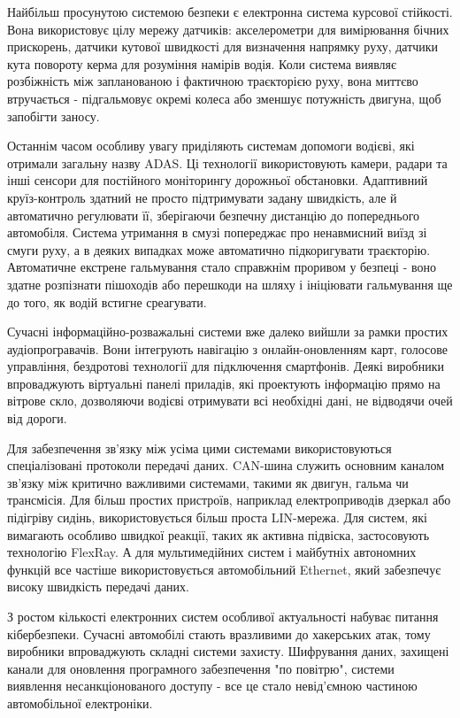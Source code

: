 \documentclass[14pt]{extreport}
\begin{document}
Найбільш просунутою системою безпеки є електронна система курсової стійкості. Вона використовує цілу мережу датчиків: акселерометри для вимірювання бічних прискорень, датчики кутової швидкості для визначення напрямку руху, датчики кута повороту керма для розуміння намірів водія. Коли система виявляє розбіжність між запланованою і фактичною траєкторією руху, вона миттєво втручається - підгальмовує окремі колеса або зменшує потужність двигуна, щоб запобігти заносу.

Останнім часом особливу увагу приділяють системам допомоги водієві, які отримали загальну назву ADAS. Ці технології використовують камери, радари та інші сенсори для постійного моніторингу дорожньої обстановки. Адаптивний круїз-контроль здатний не просто підтримувати задану швидкість, але й автоматично регулювати її, зберігаючи безпечну дистанцію до попереднього автомобіля. Система утримання в смузі попереджає про ненавмисний виїзд зі смуги руху, а в деяких випадках може автоматично підкоригувати траєкторію. Автоматичне екстрене гальмування стало справжнім проривом у безпеці - воно здатне розпізнати пішоходів або перешкоди на шляху і ініціювати гальмування ще до того, як водій встигне среагувати.

Сучасні інформаційно-розважальні системи вже далеко вийшли за рамки простих аудіопрогравачів. Вони інтегрують навігацію з онлайн-оновленням карт, голосове управління, бездротові технології для підключення смартфонів. Деякі виробники впроваджують віртуальні панелі приладів, які проектують інформацію прямо на вітрове скло, дозволяючи водієві отримувати всі необхідні дані, не відводячи очей від дороги.

Для забезпечення зв'язку між усіма цими системами використовуються спеціалізовані протоколи передачі даних. CAN-шина служить основним каналом зв'язку між критично важливими системами, такими як двигун, гальма чи трансмісія. Для більш простих пристроїв, наприклад електроприводів дзеркал або підігріву сидінь, використовується більш проста LIN-мережа. Для систем, які вимагають особливо швидкої реакції, таких як активна підвіска, застосовують технологію FlexRay. А для мультимедійних систем і майбутніх автономних функцій все частіше використовується автомобільний Ethernet, який забезпечує високу швидкість передачі даних.

З ростом кількості електронних систем особливої актуальності набуває питання кібербезпеки. Сучасні автомобілі стають вразливими до хакерських атак, тому виробники впроваджують складні системи захисту. Шифрування даних, захищені канали для оновлення програмного забезпечення "по повітрю", системи виявлення несанкціонованого доступу - все це стало невід'ємною частиною автомобільної електроніки.
\end{document}
